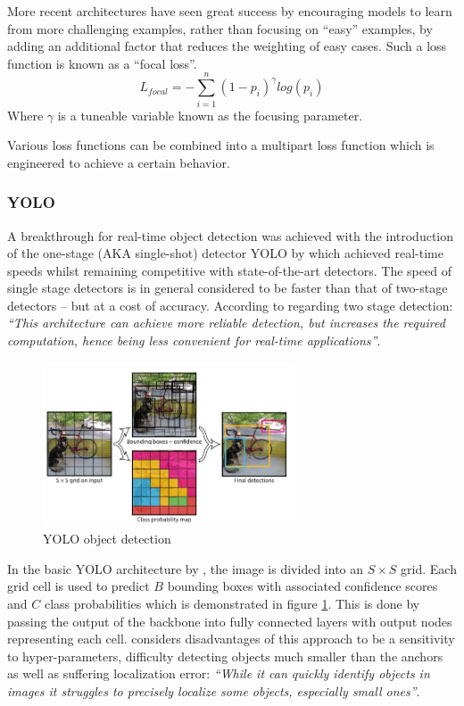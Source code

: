 \documentclass[a4paper,twoside,12pt]{report}
\begin{document}
More recent architectures have seen great success by encouraging models to learn from more challenging examples, rather than focusing on ``easy'' examples, by adding an additional factor that reduces the weighting of easy cases. Such a loss function is known as a ``focal loss''. \citep{focal}
\begin{equation}
L_{focal} = -\sum_{i=1}^{n} (1-p_i)^\gamma log(p_i)
\end{equation} 
Where $\gamma$ is a tuneable variable known as the focusing parameter.

Various loss functions can be combined into a multipart loss function which is engineered to achieve a certain behavior.

\subsubsection{YOLO}

A breakthrough for real-time object detection was achieved with the introduction of the one-stage (AKA single-shot) detector YOLO by \cite{yolo} which achieved real-time speeds whilst remaining competitive with state-of-the-art detectors. The speed of single stage detectors is in general considered to be faster than that of two-stage detectors -- but at a cost of accuracy. According to \cite{stagecomp} regarding two stage detection: \textit{``This architecture can achieve more reliable detection, but increases the required computation, hence being less convenient for real-time applications''}. 

\begin{figure}[h!]
\begin{center}
\includegraphics[width=7.5cm]{images/yolodemo.jpg}
\caption{YOLO object detection \citep{yolo}}
\label{fig:yolodemo}
\end{center}
\end{figure}

In the basic YOLO architecture by \cite{yolo}, the image is divided into an $S \times S$ grid. Each grid cell is used to predict $B$ bounding boxes with associated confidence scores and $C$ class probabilities which is demonstrated in figure \ref{fig:yolodemo}. This is done by passing the output of the backbone into fully connected layers with output nodes representing each cell. \cite{yolo} considers disadvantages of this approach to be a sensitivity to hyper-parameters, difficulty detecting objects much smaller than the anchors as well as suffering localization error: \textit{``While it can quickly identify objects in images it struggles to precisely localize some objects, especially small ones''}. 
\end{document}
